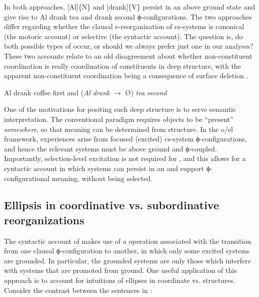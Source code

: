   In both approaches, [Al]\{N\} and [drank]\{V\} persist in an above ground state and give rise to {\textbar}Al drank tea{\textbar} and {\textbar}drank second{\textbar} ϕ-configurations. The two approaches differ regarding whether the clausal e-reorganization of cs-systems is canonical (the motoric account) or selective (the syntactic account). The question is, do both possible types of  occur, or should we always prefer just one in our analyses? These two accounts relate to an old disagreement about whether non-constituent coordination is really coordination of constituents in deep structure, with the apparent non-constituent coordination being a consequence of surface deletion \citep{DalrympleEtAl1991,Merchant2001,SagEtAl1985}. 

  \ea\label{ex:7:2x}
{Al drank coffee first and} (\textit{Al drank} $\rightarrow$ Ø) \textit{tea second}
\z

  One of the motivations for positing such deep structure is to serve semantic interpretation. The conventional paradigm requires objects to be “present” \textit{somewhere}, so that meaning can be determined from structure. In the o/el framework,  experiences arise from  focused (excited) cs-system ϕ-configurations, and hence the relevant systems must be above ground and ϕ-coupled. Importantly, selection-level excitation is not required for , and this allows for a syntactic account in which systems can persist in an  and support ϕ-configurational meaning, without being selected. 

\subsection{Ellipsis in coordinative vs. subordinative reorganizations}

The syntactic account of  makes use of a  operation associated with the transition from one clausal ϕ-configuration to another, in which only some excited systems are grounded. In particular, the grounded systems are only those which interfere with systems that are promoted from ground. One useful application of this approach is to account for  intuitions of ellipses in coordinate vs.  structures. Consider the  contrast between the sentences in :

\ea\label{ex:7:3}
   \label{ex:7:3a}
\label{ex:7:3b}
\z
\z
\judgewidth{*}

